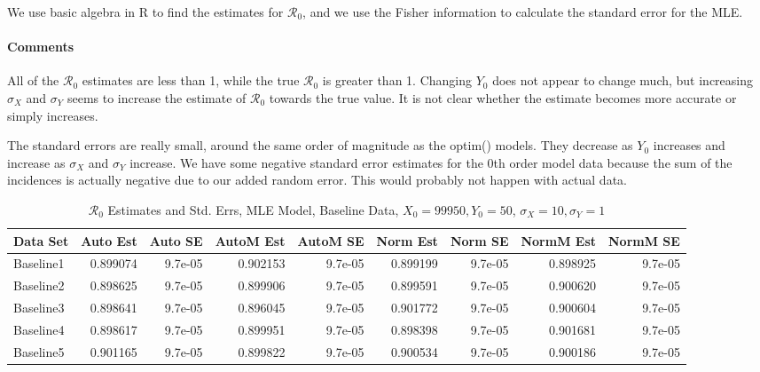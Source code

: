 \documentclass[12pt]{article}
\newcommand{\rr}{\ensuremath{\mathcal{R}_0}}
\begin{document}
We use basic algebra in R to find the estimates for $\rr$, and we use the Fisher information to calculate the standard error for the MLE.

\paragraph{Comments}

All of the $\rr$ estimates are less than 1, while the true $\rr$ is greater than 1. Changing $Y_0$ does not appear to change much, but increasing $\sigma_X$ and $\sigma_Y$ seems to increase the estimate of $\rr$ towards the true value. It is not clear whether the estimate becomes more accurate or simply increases.

The standard errors are really small, around the same order of magnitude as the optim() models. They decrease as $Y_0$ increases and increase as $\sigma_X$ and $\sigma_Y$ increase. We have some negative standard error estimates for the 0th order model data because the sum of the incidences is actually negative due to our added random error. This would probably not happen with actual data.

\begin{table}[H]
	
	\caption{$\rr$ Estimates and Std. Errs, MLE Model, 
		Baseline Data, $X_0 = 99950, Y_0 = 50$, 
		$\sigma_X = 10, \sigma_Y = 1$}
	\begin{footnotesize}
		\hskip -1cm
		\begin{tabular}{l|r|r|r|r|r|r|r|r}
			\hline
			Data Set & Auto Est & Auto SE & AutoM Est & AutoM SE & Norm Est & Norm SE & NormM Est & NormM SE\\
			\hline
			Baseline1 & 0.899074 & 9.7e-05 & 0.902153 & 9.7e-05 & 0.899199 & 9.7e-05 & 0.898925 & 9.7e-05\\
			\hline
			Baseline2 & 0.898625 & 9.7e-05 & 0.899906 & 9.7e-05 & 0.899591 & 9.7e-05 & 0.900620 & 9.7e-05\\
			\hline
			Baseline3 & 0.898641 & 9.7e-05 & 0.896045 & 9.7e-05 & 0.901772 & 9.7e-05 & 0.900604 & 9.7e-05\\
			\hline
			Baseline4 & 0.898617 & 9.7e-05 & 0.899951 & 9.7e-05 & 0.898398 & 9.7e-05 & 0.901681 & 9.7e-05\\
			\hline
			Baseline5 & 0.901165 & 9.7e-05 & 0.899822 & 9.7e-05 & 0.900534 & 9.7e-05 & 0.900186 & 9.7e-05\\
			\hline
		\end{tabular}
	\end{footnotesize}
\end{table}
\end{document}
